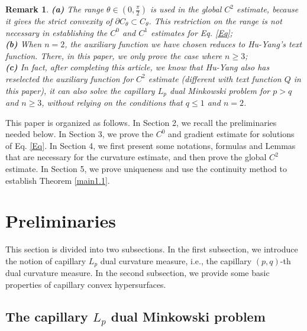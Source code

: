 \documentclass[11pt]{amsart}
\newtheorem{remark}[prop]{Remark}
\numberwithin{equation} {section}
\numberwithin{equation}{section}
\begin{document}
\begin{remark}
    {\bf (a)}
    The range $\theta\in (0,\frac{\pi}{2})$ is used in the global $C^2$ estimate, because it gives the strict convexity of $\partial C_{\theta}\subset C_{\theta}$. This restriction on the range is not necessary in establishing the $C^0$ and $C^1$ estimates for Eq. \eqref{Eq};\\ 
    {\bf (b)}
    When $n=2$, the auxiliary function we have chosen reduces to Hu-Yang's \cite{HY26} text function. There, in this paper, we only prove the case where $n\geq 3$;\\
    {\bf (c)}
In fact, after completing this article, we know that Hu-Yang also has reselected the auxiliary function for $C^2$ estimate (different with text function $Q$ in this paper), it can also solve the capillary $L_p$ dual Minkowski problem for $p>q$ and $n\geq 3$, without relying on the conditions that $q\leq 1$ and $n=2$.

\end{remark}


This paper is organized as follows. In Section 2, we recall the preliminaries needed below. In Section 3, we prove the $C^0$ and gradient estimate for solutions of Eq. \eqref{Eq}. In Section 4, we first present some notations, formulas and Lemmas that are necessary for the curvature estimate, and then prove the global $C^2$ estimate. In Section 5, we prove uniqueness and use the continuity method to establish Theorem \ref{main1.1}.



\section{Preliminaries } \label{se2}
This section is divided into two subsections. In the first subsection, we introduce the notion of capillary $L_p$ dual curvature measure, i.e., the capillary $(p,q)$-th dual curvature measure. 
In the second subsection, we provide some basic properties of capillary convex hypersurfaces.  

\subsection{The capillary $L_p$ dual Minkowski problem}
\end{document}
